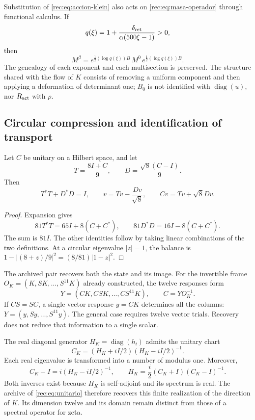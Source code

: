 Substitution of \eqref{rec:eq:accion-klein} also acts on \eqref{rec:eq:masa-operador} through functional calculus. If
\[
 q(\xi)=1+\frac{\delta_{\rm ret}}{\alpha(500\xi-1)}>0,
\]
then
\[
 M^\beta=e^{\frac12(\log q(\xi))B}\,M^0\,
          e^{\frac12(\log q(\xi))B}.
\]
The genealogy of each exponent and each multisection is preserved. The structure shared with the flow of \(K\) consists of removing a uniform component and then applying a deformation of determinant one; \(B_0\) is not identified with \(\operatorname{diag}(u)\), nor \(R_{\rm act}\) with \(\rho\).

\subsection{Circular compression and identification of transport}

\begin{theorem}
\label{rec:thm:operador}
Let \(C\) be unitary on a Hilbert space, and let
\[
 T=\frac{8I+C}{9},\qquad D=\frac{\sqrt8(C-I)}9.
\]
Then
\begin{equation}
 T^*T+D^*D=I,\qquad
 v=Tv-\frac{Dv}{\sqrt8},\qquad Cv=Tv+\sqrt8Dv.
 \label{rec:eq:unitario}
\end{equation}
\end{theorem}
\begin{proof}
Expansion gives
\[
 81T^*T=65I+8(C+C^*),\qquad
 81D^*D=16I-8(C+C^*).
\]
The sum is \(81I\). The other identities follow by taking linear combinations of the two definitions. At a circular eigenvalue \(|z|=1\), the balance is
\(1-|(8+z)/9|^2=(8/81)|1-z|^2\).
\end{proof}

The archived pair recovers both the state and its image. For the invertible frame \(O_K=(K,SK,\ldots,S^{11}K)\) already constructed, the twelve responses form
\[
 Y=(CK,CSK,\ldots,CS^{11}K),\qquad C=YO_K^{-1}.
\]
If \(CS=SC\), a single vector response \(y=CK\) determines all the columns: \(Y=(y,Sy,\ldots,S^{11}y)\). The general case requires twelve vector trials. Recovery does not reduce that information to a single scalar.

The real diagonal generator \(H_K=\operatorname{diag}(h_i)\) admits the unitary chart
\[
 C_K=(H_K+iI/2)(H_K-iI/2)^{-1}.
\]
Each real eigenvalue is transformed into a number of modulus one. Moreover,
\[
 C_K-I=i(H_K-iI/2)^{-1},\qquad
 H_K=\frac i2(C_K+I)(C_K-I)^{-1}.
\]
Both inverses exist because \(H_K\) is self-adjoint and its spectrum is real. The archive of \eqref{rec:eq:unitario} therefore recovers this finite realization of the direction of \(K\). Its dimension twelve and its domain remain distinct from those of a spectral operator for zeta.

